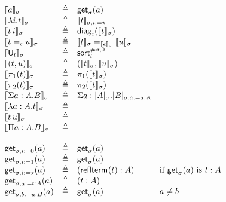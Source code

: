 \documentclass{article}
\newcommand{\sort}[1]{\mathsf{U}_{#1}}
\newcommand{\defeq}{\triangleq}
\begin{document}
$$
\begin{array}{lcll}
\semnew{\sigma}{a} & \defeq & \access{\sigma}{a}\\
\semnew{\sigma}{\lambda i.t} & \defeq & \semnew{\sigma,i:=\star}{t}\\
\semnew{\sigma}{t \, i} & \defeq & \diag{i}{\semnew{\sigma}{t}}\\
\semnew{\sigma}{t =_\epsilon u} & \defeq & \semnew{\sigma}{t} =_{\semnew{\sigma}{\epsilon}} \semnew{\sigma}{u}\\
\semnew{\sigma}{\sort{l}} & \defeq & \semsort{l}^{\#\sigma,0}\\
\semnew{\sigma}{(t,u)} & \defeq & (\semnew{\sigma}{t},\semnew{\sigma}{u})\\
\semnew{\sigma}{\pi_1(t)} & \defeq & \pi_1(\semnew{\sigma}{t})\\
\semnew{\sigma}{\pi_2(t)} & \defeq & \pi_2(\semnew{\sigma}{t})\\
\semnew{\sigma}{\Sigma a:A.B} & \defeq & \Sigma a:\semtypenew{\sigma}{A}.\semtypenew{\sigma,a:=a:A}{B}\\
\semnew{\sigma}{\lambda a:A.t} & \defeq & \\%
\semnew{\sigma}{t\,u} & \defeq & \\%
\semnew{\sigma}{\Pi a:A.B} & \defeq & \\%
\\
\access{\sigma, i:=0}{a} & \defeq & \access{\sigma}{a} \\
\access{\sigma, i:=1}{a} & \defeq & \access{\sigma}{a} \\
\access{\sigma, i:=\star}{a} & \defeq & (\refltermn{}{A}{t}:A) \qquad & \mbox{if $\access{\sigma}{a}$ is $t:A$}\\
\access{\sigma, a:=t:A}{a} & \defeq & (t:A) \\
\access{\sigma, b:=u:B}{a} & \defeq & \access{\sigma}{a} & a \neq b\\
\end{array}
$$
\end{document}
